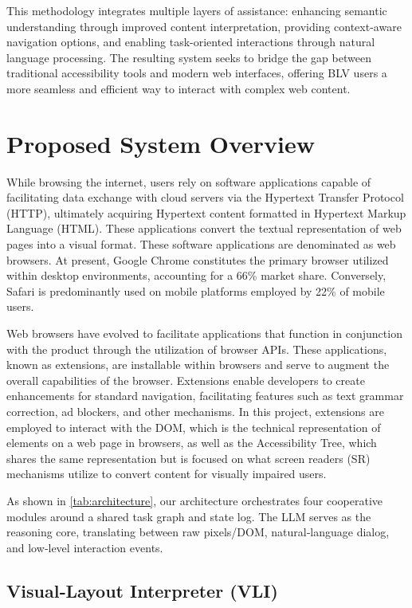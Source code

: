 \documentclass[conference]{IEEEtran}
\begin{document}
This methodology integrates multiple layers of assistance: enhancing semantic understanding through improved content interpretation, providing context-aware navigation options, and enabling task-oriented interactions through natural language processing. The resulting system seeks to bridge the gap between traditional accessibility tools and modern web interfaces, offering BLV users a more seamless and efficient way to interact with complex web content.

\section{Proposed System Overview}\label{system}

While browsing the internet, users rely on software applications capable of facilitating data exchange with cloud servers via the Hypertext Transfer Protocol (HTTP), ultimately acquiring Hypertext content formatted in Hypertext Markup Language (HTML). These applications convert the textual representation of web pages into a visual format. These software applications are denominated as web browsers. At present, Google Chrome constitutes the primary browser utilized within desktop environments, accounting for a 66\% market share. Conversely, Safari is predominantly used on mobile platforms employed by 22\%  of mobile users.\cite{browserstats2025}

Web browsers have evolved to facilitate applications that function in conjunction with the product through the utilization of browser APIs. These applications, known as extensions, are installable within browsers and serve to augment the overall capabilities of the browser. Extensions enable developers to create enhancements for standard navigation, facilitating features such as text grammar correction, ad blockers, and other mechanisms. In this project, extensions are employed to interact with the DOM, which is the technical representation of elements on a web page in browsers, as well as the Accessibility Tree, which shares the same representation but is focused on what screen readers (SR) mechanisms utilize to convert content for visually impaired users.

As shown in \autoref{tab:architecture}, our architecture orchestrates four cooperative modules around a shared task graph and state log. The LLM serves as the reasoning core, translating between raw pixels/DOM, natural‑language dialog, and low‑level interaction events.

\subsection{Visual‑Layout Interpreter (VLI)}
\end{document}
